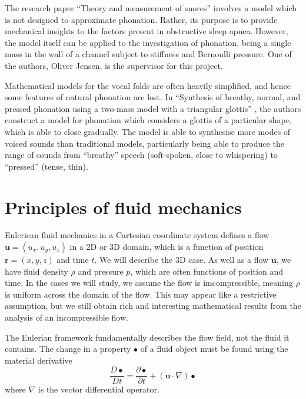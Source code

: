 \documentclass{report}
\begin{document}
The research paper ``Theory and measurement of snores'' \cite[1993]{gavriely_jensen_1993} involves a model which is not designed to approximate phonation.
Rather, its purpose is to provide mechanical insights to the factors present in obstructive sleep apnea.
However, the model itself can be applied to the investigation of phonation,
being a single mass in the wall of a channel subject to stiffness and Bernoulli pressure.
One of the authors, Oliver Jensen, is the supervisor for this project.

Mathematical models for the vocal folds are often heavily simplified, and hence some features of natural phonation are lost.
In ``Synthesis of breathy, normal, and pressed phonation using a two-mass model with a triangular glottis'' \cite[2011]{birkholz_2011},
the authors construct a model for phonation which considers a glottis of a particular shape, which is able to close gradually.
The model is able to synthesise more modes of voiced sounds than traditional models,
particularly being able to produce the range of sounds from ``breathy'' speech (soft-spoken, close to whispering) to ``pressed'' (tense, thin). 

\section{Principles of fluid mechanics}

Euleriean fluid mechanics in a Cartesian coordinate system defines a flow $\mathbf{u}=(u_x,u_y,u_z)$ in a $2$D or $3$D domain,
which is a function of position $\mathbf{r} = (x,y,z)$ and time $t$.
We will describe the $3$D case.
As well as a flow $\mathbf{u}$,
we have fluid density $\rho$ and pressure $p$,
which are often functions of position and time.
In the cases we will study,
we assume the flow is imcompressible,
meaning $\rho$ is uniform across the domain of the flow.
This may appear like a restrictive assumption,
but we still obtain rich and interesting mathematical results from the analysis of an incompressible flow.

The Eulerian framework fundamentally describes the flow field, not the fluid it contains.
The change in a property $\bullet$ of a fluid object must be found using the material derivative
\begin{equation}
    \frac{D\bullet}{Dt} = \frac{\partial \bullet}{\partial t} + (\mathbf{u}\cdot \nabla)\bullet
\end{equation}
where $\nabla$ is the vector differential operator.
\end{document}
